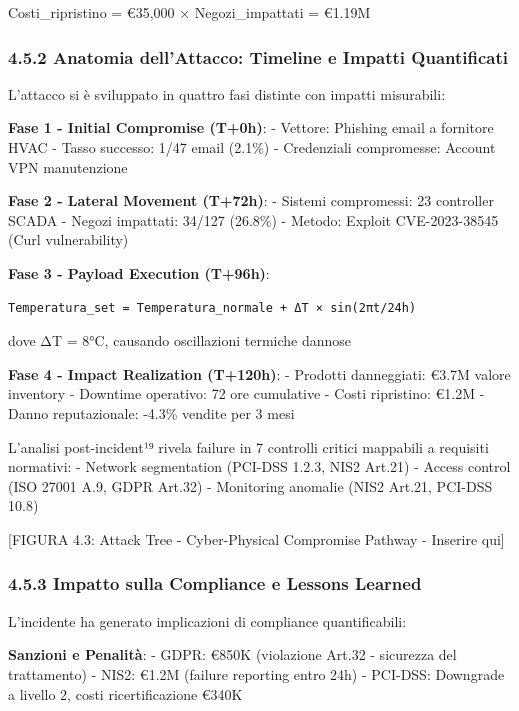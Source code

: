 \documentclass[12pt,a4paper,oneside]{book}
\begin{document}
Costi\_ripristino = €35,000 × Negozi\_impattati = €1.19M

\subsubsection{4.5.2 Anatomia dell'Attacco: Timeline e Impatti
Quantificati}\label{anatomia-dellattacco-timeline-e-impatti-quantificati}

L'attacco si è sviluppato in quattro fasi distinte con impatti
misurabili:

\textbf{Fase 1 - Initial Compromise (T+0h)}: - Vettore: Phishing email a
fornitore HVAC - Tasso successo: 1/47 email (2.1\%) - Credenziali
compromesse: Account VPN manutenzione

\textbf{Fase 2 - Lateral Movement (T+72h)}: - Sistemi compromessi: 23
controller SCADA - Negozi impattati: 34/127 (26.8\%) - Metodo: Exploit
CVE-2023-38545 (Curl vulnerability)

\textbf{Fase 3 - Payload Execution (T+96h)}:

\begin{verbatim}
Temperatura_set = Temperatura_normale + ΔT × sin(2πt/24h)
\end{verbatim}

dove ΔT = 8°C, causando oscillazioni termiche dannose

\textbf{Fase 4 - Impact Realization (T+120h)}: - Prodotti danneggiati:
€3.7M valore inventory - Downtime operativo: 72 ore cumulative - Costi
ripristino: €1.2M - Danno reputazionale: -4.3\% vendite per 3 mesi

L'analisi post-incident¹⁹ rivela failure in 7 controlli critici
mappabili a requisiti normativi: - Network segmentation (PCI-DSS 1.2.3,
NIS2 Art.21) - Access control (ISO 27001 A.9, GDPR Art.32) - Monitoring
anomalie (NIS2 Art.21, PCI-DSS 10.8)

{[}FIGURA 4.3: Attack Tree - Cyber-Physical Compromise Pathway -
Inserire qui{]}

\subsubsection{4.5.3 Impatto sulla Compliance e Lessons
Learned}\label{impatto-sulla-compliance-e-lessons-learned}

L'incidente ha generato implicazioni di compliance quantificabili:

\textbf{Sanzioni e Penalità}: - GDPR: €850K (violazione Art.32 -
sicurezza del trattamento) - NIS2: €1.2M (failure reporting entro 24h) -
PCI-DSS: Downgrade a livello 2, costi ricertificazione €340K
\end{document}
